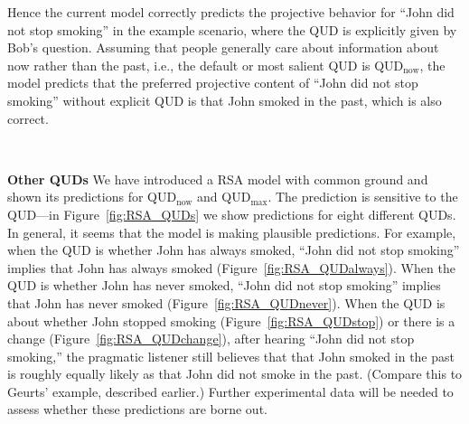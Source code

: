 Hence the current model correctly predicts the projective behavior for 
 ``John did not stop smoking'' in the example scenario, where the QUD is explicitly
 given by Bob's question. 
Assuming that people generally care about information about now rather than 
 the past, i.e., the default or most salient QUD is QUD$_\text{now}$,
the model predicts that the preferred projective content of 
 ``John did not stop smoking'' without explicit QUD is that 
 John smoked in the past, which is also correct.


\

\noindent \textbf{Other QUDs} \quad 
We have introduced a RSA model with common ground and shown its
 predictions for QUD$_\textrm{now}$ and QUD$_\textrm{max}$.
The prediction is sensitive to the QUD---in Figure~\ref{fig:RSA_QUDs} we show predictions for eight different QUDs.
In general, it seems that the model is making plausible predictions. 
For example, when the QUD is whether John has always smoked, ``John did not stop smoking'' implies that John has always smoked (Figure~\ref{fig:RSA_QUDalways}). 
When the QUD is whether John has never smoked, ``John did not stop smoking'' implies that John has never smoked (Figure~\ref{fig:RSA_QUDnever}). 
When the QUD is about whether John stopped smoking (Figure~\ref{fig:RSA_QUDstop}) 
 or there is a change (Figure~\ref{fig:RSA_QUDchange}), after hearing
 ``John did not stop smoking,'' the pragmatic listener still believes that that John 
 smoked in the past is roughly equally likely as that John did not smoke in the past. 
 (Compare this to Geurts' example, described earlier.)
Further experimental data will be needed to assess whether these predictions are borne out.



